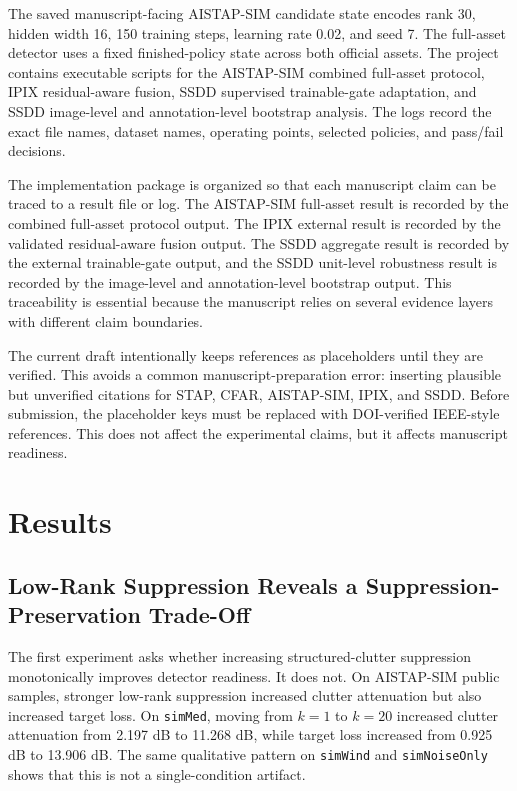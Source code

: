 \documentclass[journal]{IEEEtran}
\begin{document}
The saved manuscript-facing AISTAP-SIM candidate state encodes rank 30, hidden width 16, 150 training steps, learning rate 0.02, and seed 7. The full-asset detector uses a fixed finished-policy state across both official assets. The project contains executable scripts for the AISTAP-SIM combined full-asset protocol, IPIX residual-aware fusion, SSDD supervised trainable-gate adaptation, and SSDD image-level and annotation-level bootstrap analysis. The logs record the exact file names, dataset names, operating points, selected policies, and pass/fail decisions.

The implementation package is organized so that each manuscript claim can be traced to a result file or log. The AISTAP-SIM full-asset result is recorded by the combined full-asset protocol output. The IPIX external result is recorded by the validated residual-aware fusion output. The SSDD aggregate result is recorded by the external trainable-gate output, and the SSDD unit-level robustness result is recorded by the image-level and annotation-level bootstrap output. This traceability is essential because the manuscript relies on several evidence layers with different claim boundaries.

The current draft intentionally keeps references as placeholders until they are verified. This avoids a common manuscript-preparation error: inserting plausible but unverified citations for STAP, CFAR, AISTAP-SIM, IPIX, and SSDD. Before submission, the placeholder keys must be replaced with DOI-verified IEEE-style references. This does not affect the experimental claims, but it affects manuscript readiness.

\section{Results}

\subsection{Low-Rank Suppression Reveals a Suppression-Preservation Trade-Off}

The first experiment asks whether increasing structured-clutter suppression monotonically improves detector readiness. It does not. On AISTAP-SIM public samples, stronger low-rank suppression increased clutter attenuation but also increased target loss. On \texttt{simMed}, moving from $k=1$ to $k=20$ increased clutter attenuation from 2.197 dB to 11.268 dB, while target loss increased from 0.925 dB to 13.906 dB. The same qualitative pattern on \texttt{simWind} and \texttt{simNoiseOnly} shows that this is not a single-condition artifact.
\end{document}
